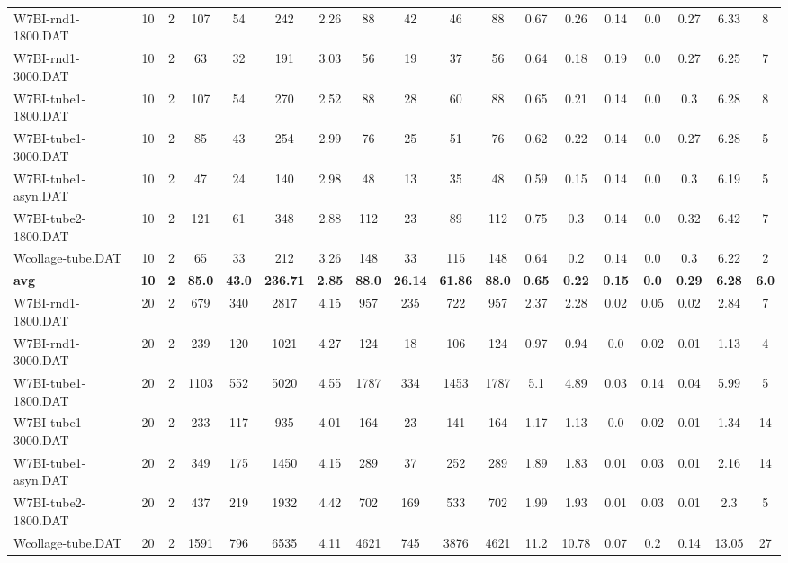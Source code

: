 \begin{sidewaystable}[h]
{\begin{tabular}{lccccccccccccccccc}
W7BI-rnd1-1800.DAT & 10 & 2 & 107 & 54 & 242 & 2.26 & 88 & 42 & 46 & 88 & 0.67 & 0.26 & 0.14 & 0.0 & 0.27 & 6.33 & 8\\
W7BI-rnd1-3000.DAT & 10 & 2 & 63 & 32 & 191 & 3.03 & 56 & 19 & 37 & 56 & 0.64 & 0.18 & 0.19 & 0.0 & 0.27 & 6.25 & 7\\
W7BI-tube1-1800.DAT & 10 & 2 & 107 & 54 & 270 & 2.52 & 88 & 28 & 60 & 88 & 0.65 & 0.21 & 0.14 & 0.0 & 0.3 & 6.28 & 8\\
W7BI-tube1-3000.DAT & 10 & 2 & 85 & 43 & 254 & 2.99 & 76 & 25 & 51 & 76 & 0.62 & 0.22 & 0.14 & 0.0 & 0.27 & 6.28 & 5\\
W7BI-tube1-asyn.DAT & 10 & 2 & 47 & 24 & 140 & 2.98 & 48 & 13 & 35 & 48 & 0.59 & 0.15 & 0.14 & 0.0 & 0.3 & 6.19 & 5\\
W7BI-tube2-1800.DAT & 10 & 2 & 121 & 61 & 348 & 2.88 & 112 & 23 & 89 & 112 & 0.75 & 0.3 & 0.14 & 0.0 & 0.32 & 6.42 & 7\\
Wcollage-tube.DAT & 10 & 2 & 65 & 33 & 212 & 3.26 & 148 & 33 & 115 & 148 & 0.64 & 0.2 & 0.14 & 0.0 & 0.3 & 6.22 & 2\\
\cline{1-18} \textbf{avg} & \textbf{10} & \textbf{2} & \textbf{85.0} & \textbf{43.0} & \textbf{236.71} & \textbf{2.85} & \textbf{88.0} & \textbf{26.14} & \textbf{61.86} & \textbf{88.0} & \textbf{0.65} & \textbf{0.22} & \textbf{0.15} & \textbf{0.0} & \textbf{0.29} & \textbf{6.28} & \textbf{6.0} \\ \cline{1-18}
W7BI-rnd1-1800.DAT & 20 & 2 & 679 & 340 & 2817 & 4.15 & 957 & 235 & 722 & 957 & 2.37 & 2.28 & 0.02 & 0.05 & 0.02 & 2.84 & 7\\
W7BI-rnd1-3000.DAT & 20 & 2 & 239 & 120 & 1021 & 4.27 & 124 & 18 & 106 & 124 & 0.97 & 0.94 & 0.0 & 0.02 & 0.01 & 1.13 & 4\\
W7BI-tube1-1800.DAT & 20 & 2 & 1103 & 552 & 5020 & 4.55 & 1787 & 334 & 1453 & 1787 & 5.1 & 4.89 & 0.03 & 0.14 & 0.04 & 5.99 & 5\\
W7BI-tube1-3000.DAT & 20 & 2 & 233 & 117 & 935 & 4.01 & 164 & 23 & 141 & 164 & 1.17 & 1.13 & 0.0 & 0.02 & 0.01 & 1.34 & 14\\
W7BI-tube1-asyn.DAT & 20 & 2 & 349 & 175 & 1450 & 4.15 & 289 & 37 & 252 & 289 & 1.89 & 1.83 & 0.01 & 0.03 & 0.01 & 2.16 & 14\\
W7BI-tube2-1800.DAT & 20 & 2 & 437 & 219 & 1932 & 4.42 & 702 & 169 & 533 & 702 & 1.99 & 1.93 & 0.01 & 0.03 & 0.01 & 2.3 & 5\\
Wcollage-tube.DAT & 20 & 2 & 1591 & 796 & 6535 & 4.11 & 4621 & 745 & 3876 & 4621 & 11.2 & 10.78 & 0.07 & 0.2 & 0.14 & 13.05 & 27\\

\end{tabular}}
\end{sidewaystable}
